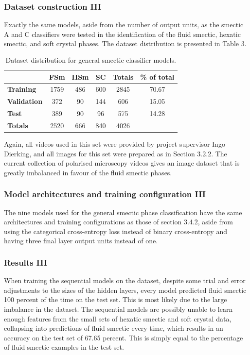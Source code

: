 \documentclass[12pt]{article}
\begin{document}
\subsubsection{Dataset construction III}
Exactly the same models, aside from the number of output units, as the smectic A and C classifiers were tested in the identification of the fluid smectic, hexatic smectic, and soft crystal phases. The dataset distribution is presented in Table 3.
\begin{table}[!htb]
\begin{center}
\caption{Dataset distribution for general smectic classifier models.}
\begin{tabular}{l|c|c|c|c|c}
\toprule
& \textbf{FSm} & \textbf{HSm} & \textbf{SC} & \textbf{Totals} & \textbf{\% of total}\\
\midrule
\textbf{Training} & 1759 & 486 & 600 & 2845 & 70.67\\
\textbf{Validation} & 372 & 90 & 144 & 606 & 15.05\\
\textbf{Test} & 389 & 90 & 96 & 575 & 14.28\\
\midrule
\textbf{Totals} & 2520 & 666 & 840 & 4026\\
\bottomrule
\end{tabular}
\end{center}
\end{table}
Again, all videos used in this set were provided by project supervisor Ingo Dierking, and all images for this set were prepared as in Section 3.2.2. The current collection of polarised microscopy videos gives an image dataset that is greatly imbalanced in favour of the fluid smectic phases. 
\subsubsection{Model architectures and training configuration III}
The nine models used for the general smectic phase classification have the same architectures and training configurations as those of section 3.4.2, aside from using the categorical cross-entropy loss instead of binary cross-entropy and having three final layer output units instead of one. 
\subsubsection{Results III}
When training the sequential models on the dataset, despite some trial and error adjustments to the sizes of the hidden layers, every model predicted fluid smectic 100 percent of the time on the test set. This is most likely due to the large imbalance in the dataset. The sequential models are possibly unable to learn enough features from the small sets of hexatic smectic and soft crystal data, collapsing into predictions of fluid smectic every time, which results in an accuracy on the test set of 67.65 percent. This is simply equal to the percentage of fluid smectic examples in the test set.
\end{document}
